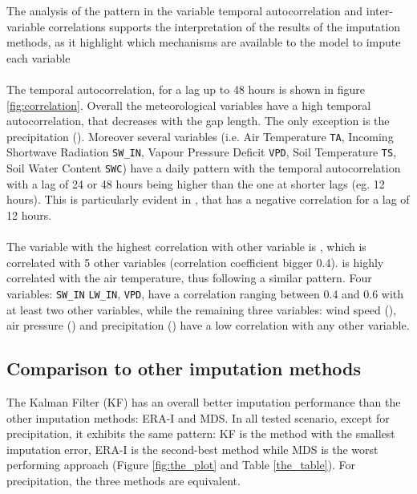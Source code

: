 \documentclass{article}
\let\Oldsubsection\subsection
\renewcommand{\subsection}{\FloatBarrier\Oldsubsection}
\begin{document}
The analysis of the pattern in the variable temporal autocorrelation and inter-variable correlations supports the interpretation of the results of the imputation methods, as it highlight which mechanisms are available to the model to impute each variable

\paragraph{} The temporal autocorrelation, for a lag up to 48 hours is shown in figure \ref{fig:correlation}. Overall the meteorological variables have a high temporal autocorrelation, that decreases with the gap length. The only exception is the precipitation (). Moreover several variables (i.e. Air Temperature \texttt{TA}, Incoming Shortwave Radiation \texttt{SW\_IN},  Vapour Pressure Deficit \texttt{VPD}, Soil Temperature \texttt{TS}, Soil Water Content \texttt{SWC}) have a daily pattern with the temporal autocorrelation with a lag of 24 or 48 hours being higher than the one at shorter lags (eg. 12 hours). This is particularly evident in , that has a negative correlation for a lag of 12 hours.

\paragraph{} The variable with the highest correlation with other variable is , which is correlated with 5 other variables (correlation coefficient bigger 0.4).  is highly correlated with the air temperature, thus following a similar pattern. Four variables: \texttt{SW\_IN} \texttt{LW\_IN}, \texttt{VPD},  have a correlation ranging between 0.4 and 0.6 with at least two other variables, while the remaining three variables: wind speed (), air pressure () and precipitation () have a low correlation with any other variable.  


\subsection{Comparison to other imputation methods}

The Kalman Filter (KF) has an overall better imputation performance than the other imputation methods: ERA-I and MDS. In all tested scenario, except for precipitation, it exhibits the same pattern: KF is the method with the smallest imputation error, ERA-I is the second-best method while MDS is the worst performing approach (Figure \ref{fig:the_plot} and Table \ref{the_table}). For precipitation, the three methods are equivalent.
\end{document}
